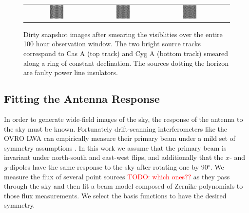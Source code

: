 \documentclass[twocolumn]{aastex6}
\newcommand{\todo}[1]{\textcolor{red}{TODO: #1}\PackageWarning{TODO:}{#1!}}
\begin{document}
\begin{figure}[ht]
\begin{tabular}{cccc}
        \includegraphics[width=0.22\textwidth]{figures/smeared-snapshots/spw14-small} &
        \includegraphics[width=0.22\textwidth]{figures/smeared-snapshots/spw16-small} &
        \includegraphics[width=0.22\textwidth]{figures/smeared-snapshots/spw18-small} \\
    \end{tabular}
    \caption{
        Dirty snapshot images after smearing the visiblities over the entire 100 hour observation
        window.  The two bright source tracks correspond to Cas A (top track) and Cyg A (bottom
        track) smeared along a ring of constant declination. The sources dotting the horizon are
        faulty power line insulators.
    }
\end{figure}

\subsection{Fitting the Antenna Response}

In order to generate wide-field images of the sky, the response of the antenna to the sky must be
known. Fortunately drift-scanning interferometers like the OVRO LWA can empirically measure their
primary beam under a mild set of symmetry assumptions \citep{2012AJ....143...53P}. In this work we
assume that the primary beam is invariant under north-south and east-west flips, and additionally
that the $x$- and $y$-dipoles have the same response to the sky after rotating one by 90$^\circ$.
We measure the flux of several point sources \todo{which ones??} as they pass through the sky and
then fit a beam model composed of Zernike polynomials to those flux measurements. We select the
basis functions to have the desired symmetry.
\end{document}
